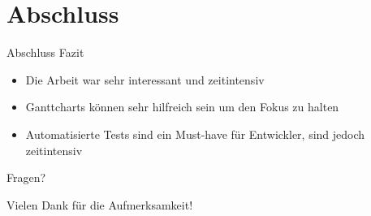 \documentclass[12pt, aspectratio=1610]{beamer}
\begin{document}
\section{Abschluss}
\label{sec:org28322d8}
\begin{frame}[label={sec:orgbf0868e}]{Abschluss}
\alert{Fazit}
\begin{itemize}
\item <2-> Die Arbeit war sehr interessant und zeitintensiv
\item <3-> Ganttcharts können sehr hilfreich sein um den Fokus zu halten
\item <4-> Automatisierte Tests sind ein Must-have für Entwickler, sind jedoch zeitintensiv
\end{itemize}
\end{frame}

\begin{frame}[label={sec:org86b8741}]{}
\alert{\huge{Fragen?}}
\end{frame}
\begin{frame}[label={sec:org7a29035}]{}
\alert{\huge{Vielen Dank für die Aufmerksamkeit!}}
\end{frame}
\end{document}
